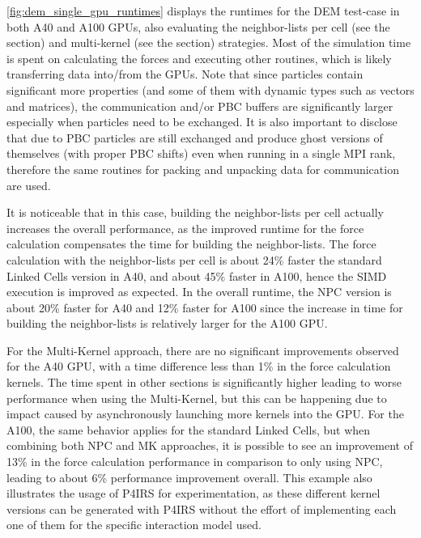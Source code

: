 \documentclass[Afour,sageh,times]{sagej}
\begin{document}
\autoref{fig:dem_single_gpu_runtimes} displays the runtimes for the DEM test-case in both A40 and A100 GPUs, also evaluating the neighbor-lists per cell (see the  section) and multi-kernel (see the  section) strategies.
Most of the simulation time is spent on calculating the forces and executing other routines, which is likely transferring data into/from the GPUs.
Note that since particles contain significant more properties (and some of them with dynamic types such as vectors and matrices), the communication and/or PBC buffers are significantly larger especially when particles need to be exchanged.
It is also important to disclose that due to PBC particles are still exchanged and produce ghost versions of themselves (with proper PBC shifts) even when running in a single MPI rank, therefore the same routines for packing and unpacking data for communication are used.

It is noticeable that in this case, building the neighbor-lists per cell actually increases the overall performance, as the improved runtime for the force calculation compensates the time for building the neighbor-lists.
The force calculation with the neighbor-lists per cell is about 24\% faster the standard Linked Cells version in A40, and about 45\% faster in A100, hence the SIMD execution is improved as expected.
In the overall runtime, the NPC version is about 20\% faster for A40 and 12\% faster for A100 since the increase in time for building the neighbor-lists is relatively larger for the A100 GPU.

For the Multi-Kernel approach, there are no significant improvements observed for the A40 GPU, with a time difference less than 1\% in the force calculation kernels.
The time spent in other sections is significantly higher leading to worse performance when using the Multi-Kernel, but this can be happening due to impact caused by asynchronously launching more kernels into the GPU.
For the A100, the same behavior applies for the standard Linked Cells, but when combining both NPC and MK approaches, it is possible to see an improvement of 13\% in the force calculation performance in comparison to only using NPC, leading to about 6\% performance improvement overall.
This example also illustrates the usage of P4IRS for experimentation, as these different kernel versions can be generated with P4IRS without the effort of implementing each one of them for the specific interaction model used.
\end{document}
